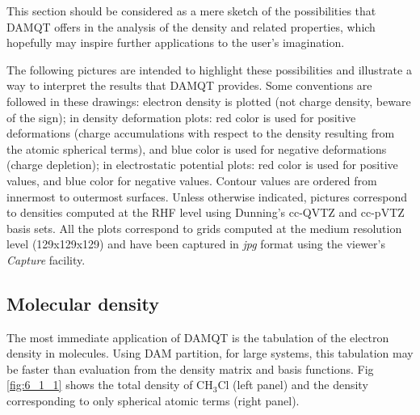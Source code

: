 \documentclass[10pt]{article}
\begin{document}
This section should be considered as a mere sketch of the possibilities that
DAMQT offers in the analysis of the density and related properties, which hopefully may inspire
further applications to the user's imagination.

The following pictures are intended to highlight these possibilities and illustrate a way to interpret the results that DAMQT provides. Some
conventions are followed in these drawings: electron density is plotted (not
charge density, beware of the sign); in density deformation plots:
red color is used for positive deformations (charge accumulations with respect 
to the density resulting from the atomic spherical terms), and blue color is
used for negative deformations (charge depletion); in electrostatic potential plots:
red color is used for positive values, and blue color for negative values.
Contour values are ordered from innermost to outermost surfaces.
Unless otherwise indicated, pictures correspond to densities computed
at the RHF level using Dunning's cc-QVTZ and cc-pVTZ
basis sets\footnotemark{}.
All the plots correspond to grids computed at the medium resolution level
(129x129x129) and have been captured in {\it jpg} format using the viewer’s {\it
Capture} facility.



\subsection{Molecular density \label{sec:6.1}}

The most immediate application of DAMQT is the tabulation of the electron
density in molecules. Using DAM partition, for large systems, this tabulation 
may be faster than evaluation from the density matrix and basis functions. Fig 
\ref{fig:6_1_1} shows the total density of CH$_3$Cl (left panel) and the 
density corresponding to only spherical atomic terms (right panel).
\end{document}
